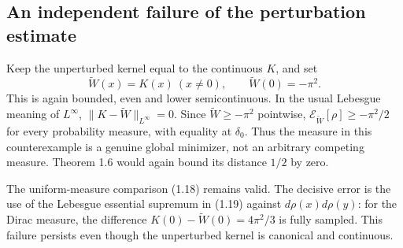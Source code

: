 \documentclass[10pt]{article}
\begin{document}
\subsection*{An independent failure of the perturbation estimate}
Keep the unperturbed kernel equal to the continuous \(K\), and set \[\widetilde W(x)=K(x)\ (x\ne0),\qquad \widetilde W(0)=-\pi^2.\] This is again bounded, even and lower semicontinuous. In the usual Lebesgue meaning of \(L^\infty\), \(\|K-\widetilde W\|_{L^\infty}=0\). Since \(\widetilde W\ge-\pi^2\) pointwise, \(\mathcal E_{\widetilde W}[\rho]\ge-\pi^2/2\) for every probability measure, with equality at \(\delta_0\). Thus the measure in this counterexample is a genuine global minimizer, not an arbitrary competing measure. Theorem 1.6 would again bound its distance \(1/2\) by zero.\par
The uniform-measure comparison (1.18) remains valid. The decisive error is the use of the Lebesgue essential supremum in (1.19) against \(d\rho(x)d\rho(y)\): for the Dirac measure, the difference \(K(0)-\widetilde W(0)=4\pi^2/3\) is fully sampled. This failure persists even though the unperturbed kernel is canonical and continuous.\par
\end{document}
